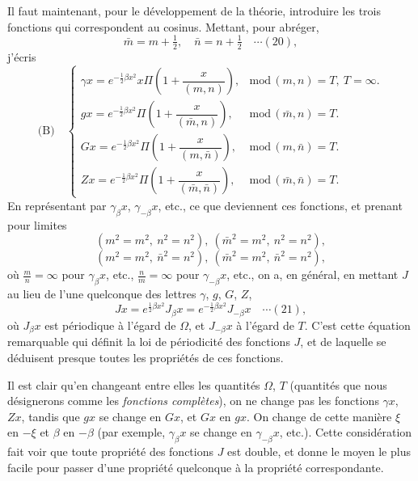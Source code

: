 \documentclass[12pt,a4paper]{article}
\begin{document}
Il faut maintenant, pour le d\'eveloppement de la th\'eorie, introduire les trois fonctions qui correspondent au cosinus. Mettant, pour abr\'eger,
\[
\bar m = m + \tfrac{1}{2},\quad \bar n = n + \tfrac{1}{2} \quad\cdots(20),
\]
j'\'ecris
\[
\text{(B)}\quad
\begin{cases}
\gamma x = e^{-\frac12\beta x^2} x\Pi\!\left(1 + \dfrac{x}{(m,n)}\right), & \mathrm{mod}\,(m,n) = T,\ T = \infty.\\[6pt]
g x = e^{-\frac12\beta x^2}\Pi\!\left(1 + \dfrac{x}{(\bar m,n)}\right), & \mathrm{mod}\,(\bar m, n) = T.\\[6pt]
G x = e^{-\frac12\beta x^2}\Pi\!\left(1 + \dfrac{x}{(m,\bar n)}\right), & \mathrm{mod}\,(m,\bar n) = T.\\[6pt]
Z x = e^{-\frac12\beta x^2}\Pi\!\left(1 + \dfrac{x}{(\bar m,\bar n)}\right), & \mathrm{mod}\,(\bar m,\bar n) = T.
\end{cases}
\]
En repr\'esentant par $\gamma_\beta x$, $\gamma_{-\beta}x$, etc., ce que deviennent ces fonctions, et prenant pour limites
\[
(m^2 = m^2,\ n^2 = n^2),\ (\bar m^2 = m^2,\ n^2 = n^2),
\]
\[
(m^2 = m^2,\ \bar n^2 = n^2),\ (\bar m^2 = m^2,\ \bar n^2 = n^2),
\]
o\`u $\tfrac{m}{n} = \infty$ pour $\gamma_\beta x$, etc., $\tfrac{n}{m} = \infty$ pour $\gamma_{-\beta}x$, etc., on a, en g\'en\'eral, en mettant $J$ au lieu de l'une quelconque des lettres $\gamma$, $g$, $G$, $Z$,
\[
Jx = e^{\frac12\beta x^2}J_\beta x = e^{-\frac12\beta x^2}J_{-\beta}x \quad\cdots(21),
\]
o\`u $J_\beta x$ est p\'eriodique \`a l'\'egard de $\Omega$, et $J_{-\beta}x$ \`a l'\'egard de $T$. C'est cette \'equation remarquable qui d\'efinit la loi de p\'eriodicit\'e des fonctions $J$, et de laquelle se d\'eduisent presque toutes les propri\'et\'es de ces fonctions.

\newpage
\setcounter{page}{168}

Il est clair qu'en changeant entre elles les quantit\'es $\Omega$, $T$ (quantit\'es que nous d\'esignerons comme les \textit{fonctions compl\`etes}), on ne change pas les fonctions $\gamma x$, $Zx$, tandis que $gx$ se change en $Gx$, et $Gx$ en $gx$. On change de cette mani\`ere $\xi$ en $-\xi$ et $\beta$ en $-\beta$ (par exemple, $\gamma_\beta x$ se change en $\gamma_{-\beta}x$, etc.). Cette consid\'eration fait voir que toute propri\'et\'e des fonctions $J$ est double, et donne le moyen le plus facile pour passer d'une propri\'et\'e quelconque \`a la propri\'et\'e correspondante.
\end{document}
